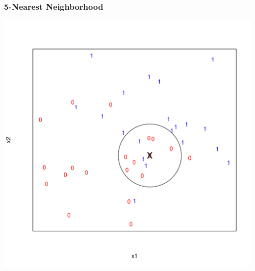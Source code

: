 \documentclass[xcolor=x11names,compress]{beamer}\usepackage[]{graphicx}\usepackage[]{color}
\newenvironment{knitrout}{}{} %
\begin{document}
\begin{frame}
  \frametitle{5-Nearest Neighborhood}
\begin{knitrout}\tiny
{}\color{fgcolor}

{\centering \includegraphics[width=.6\linewidth]{figure/beamer-knn5-1} 

}



\end{knitrout}
\end{frame}




\end{document}
